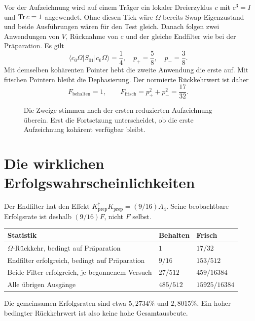 Vor der Aufzeichnung wird auf einem Träger ein lokaler Dreierzyklus $c$ mit $c^3=I$ und $\operatorname{Tr} c=1$ angewendet. Ohne diesen Tick wäre $\Omega$ bereits Swap-Eigenzustand und beide Ausführungen wären für den Test gleich. Danach folgen zwei Anwendungen von $V$, Rücknahme von $c$ und der gleiche Endfilter wie bei der Präparation. Es gilt
\begin{equation}
\langle c_0\Omega|S_{01}|c_0\Omega\rangle=\frac14,
\quad p_+=\frac58,\quad p_-=\frac38.
\end{equation}
Mit demselben kohärenten Pointer hebt die zweite Anwendung die erste auf. Mit frischen Pointern bleibt die Dephasierung. Der normierte Rückkehrwert ist daher
\begin{equation}
F_{\mathrm{behalten}}=1,\qquad
F_{\mathrm{frisch}}=p_+^2+p_-^2=\frac{17}{32}.
\label{eq:originalecho}
\end{equation}

\begin{figure}[H]\centering
{}
\caption{Die Zweige stimmen nach der ersten reduzierten Aufzeichnung überein. Erst die Fortsetzung unterscheidet, ob die erste Aufzeichnung kohärent verfügbar bleibt.}
\end{figure}

\section{Die wirklichen Erfolgswahrscheinlichkeiten}
Der Endfilter hat den Effekt $K_{\mathrm{prep}}^\dagger K_{\mathrm{prep}}=(9/16)A_4$. Seine beobachtbare Erfolgsrate ist deshalb $(9/16)F$, nicht $F$ selbst.
\par\noindent\begin{tabularx}{\linewidth}{L{68mm}Y Y}
\toprule
\textbf{Statistik}&\textbf{Behalten}&\textbf{Frisch}\\\midrule
$\Omega$-Rückkehr, bedingt auf Präparation&$1$&$17/32$\\
Endfilter erfolgreich, bedingt auf Präparation&$9/16$&$153/512$\\
Beide Filter erfolgreich, je begonnenem Versuch&$27/512$&$459/16384$\\
Alle übrigen Ausgänge&$485/512$&$15925/16384$\\\bottomrule
\end{tabularx}\par
Die gemeinsamen Erfolgsraten sind etwa $5{,}2734\%$ und $2{,}8015\%$. Ein hoher bedingter Rückkehrwert ist also keine hohe Gesamtausbeute.

